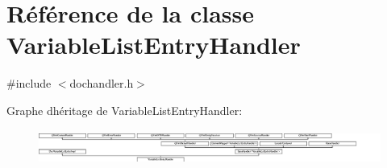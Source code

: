 \hypertarget{class_variable_list_entry_handler}{}\section{Référence de la classe Variable\+List\+Entry\+Handler}
\label{class_variable_list_entry_handler}


{\ttfamily \#include $<$dochandler.\+h$>$}

Graphe d\textquotesingle{}héritage de Variable\+List\+Entry\+Handler\+:\begin{figure}[H]
\begin{center}
\leavevmode
\includegraphics[height=1.167883cm]{class_variable_list_entry_handler}
\end{center}
\end{figure}
